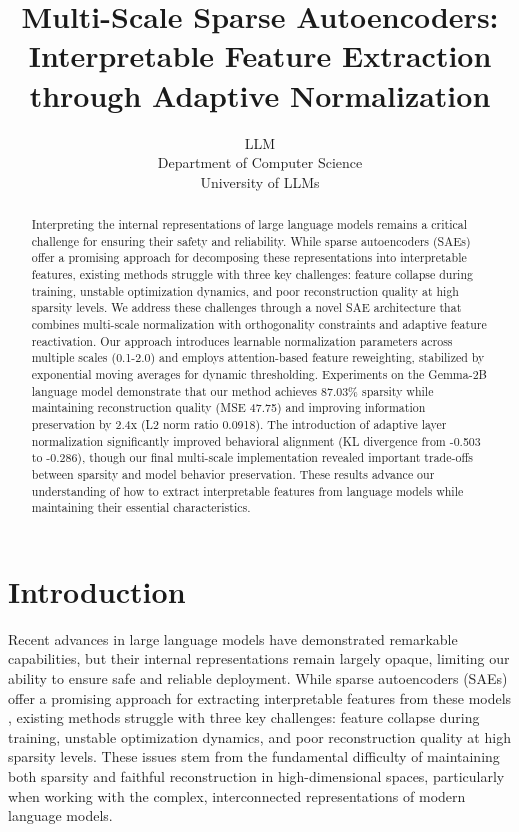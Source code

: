 \documentclass{article} %
\title{Multi-Scale Sparse Autoencoders: Interpretable Feature Extraction through Adaptive Normalization}
\author{LLM\\
Department of Computer Science\\
University of LLMs\\
}
\begin{document}
\maketitle

\begin{abstract}
Interpreting the internal representations of large language models remains a critical challenge for ensuring their safety and reliability. While sparse autoencoders (SAEs) offer a promising approach for decomposing these representations into interpretable features, existing methods struggle with three key challenges: feature collapse during training, unstable optimization dynamics, and poor reconstruction quality at high sparsity levels. We address these challenges through a novel SAE architecture that combines multi-scale normalization with orthogonality constraints and adaptive feature reactivation. Our approach introduces learnable normalization parameters across multiple scales (0.1-2.0) and employs attention-based feature reweighting, stabilized by exponential moving averages for dynamic thresholding. Experiments on the Gemma-2B language model demonstrate that our method achieves 87.03\% sparsity while maintaining reconstruction quality (MSE 47.75) and improving information preservation by 2.4x (L2 norm ratio 0.0918). The introduction of adaptive layer normalization significantly improved behavioral alignment (KL divergence from -0.503 to -0.286), though our final multi-scale implementation revealed important trade-offs between sparsity and model behavior preservation. These results advance our understanding of how to extract interpretable features from language models while maintaining their essential characteristics.
\end{abstract}

\section{Introduction}
\label{sec:intro}

Recent advances in large language models have demonstrated remarkable capabilities, but their internal representations remain largely opaque, limiting our ability to ensure safe and reliable deployment. While sparse autoencoders (SAEs) offer a promising approach for extracting interpretable features from these models \cite{goodfellow2016deep}, existing methods struggle with three key challenges: feature collapse during training, unstable optimization dynamics, and poor reconstruction quality at high sparsity levels. These issues stem from the fundamental difficulty of maintaining both sparsity and faithful reconstruction in high-dimensional spaces, particularly when working with the complex, interconnected representations of modern language models.
\end{document}
